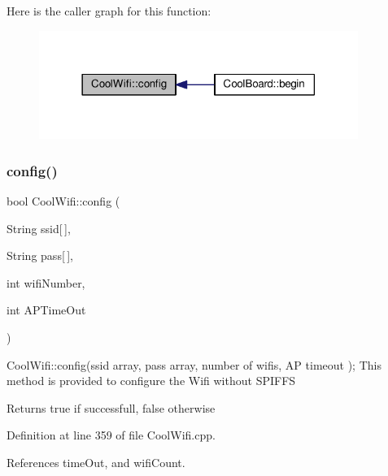 Here is the caller graph for this function\+:
\nopagebreak
\begin{figure}[H]
\begin{center}
\leavevmode
\includegraphics[width=294pt]{classCoolWifi_a4eb2f6b9b09dd588964b88b6c70122c0_icgraph}
\end{center}
\end{figure}
\mbox{\label{classCoolWifi_a871d4a0d9978f17fdf6d874fc2958b6c}} 
\subsubsection{\texorpdfstring{config()}{config()}\hspace{0.1cm}{\footnotesize\ttfamily [2/2]}}
{\footnotesize\ttfamily bool Cool\+Wifi\+::config (\begin{DoxyParamCaption}\item[{String}]{ssid\mbox{[}$\,$\mbox{]},  }\item[{String}]{pass\mbox{[}$\,$\mbox{]},  }\item[{int}]{wifi\+Number,  }\item[{int}]{A\+P\+Time\+Out }\end{DoxyParamCaption})}

Cool\+Wifi\+::config(ssid array, pass array, number of wifis, A\+P timeout ); This method is provided to configure the Wifi without S\+P\+I\+F\+FS

\begin{DoxyReturn}{Returns}
true if successfull, false otherwise 
\end{DoxyReturn}


Definition at line 359 of file Cool\+Wifi.\+cpp.



References time\+Out, and wifi\+Count.


